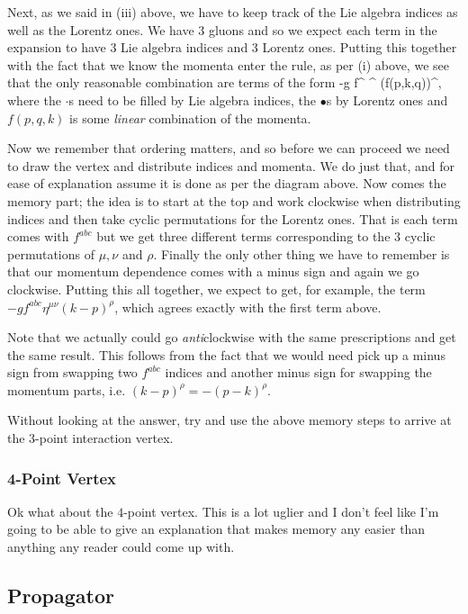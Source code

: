 Next, as we said in (iii) above, we have to keep track of the Lie algebra indices as well as the Lorentz ones. We have 3 gluons and so we expect each term in the expansion to have 3 Lie algebra indices and 3 Lorentz ones. Putting this together with the fact that we know the momenta enter the rule, as per (i) above, we see that the only reasonable combination are terms of the form 
\bse 
    -g f^{\cdot \cdot \cdot} \eta^{\bullet \bullet} (f(p,k,q))^{\bullet},
\ese 
where the $\cdot$s need to be filled by Lie algebra indices, the $\bullet$s by Lorentz ones and $f(p,q,k)$ is some \textit{linear} combination of the momenta.

Now we remember that ordering matters, and so before we can proceed we need to draw the vertex and distribute indices and momenta. We do just that, and for ease of explanation assume it is done as per the diagram above. Now comes the memory part; the idea is to start at the top and work clockwise when distributing indices and then take cyclic permutations for the Lorentz ones. That is each term comes with $f^{abc}$ but we get three different terms corresponding to the 3 cyclic permutations of $\mu,\nu$ and $\rho$. Finally the only other thing we have to remember is that our momentum dependence comes with a minus sign and again we go clockwise. Putting this all together, we expect to get, for example, the term $-gf^{abc}\eta^{\mu\nu}(k-p)^{\rho}$, which agrees exactly with the first term above.

\br 
    Note that we actually could go \textit{anti}clockwise with the same prescriptions and get the same result. This follows from the fact that we would need pick up a minus sign from swapping two $f^{abc}$ indices and another minus sign for swapping the momentum parts, i.e. $(k-p)^{\rho} = -(p-k)^{\rho}$. 
\er 

\bbox 
    Without looking at the answer, try and use the above memory steps to arrive at the 3-point interaction vertex. 
\ebox   

\subsubsection{4-Point Vertex}

Ok what about the $4$-point vertex. This is a lot uglier and I don't feel like I'm going to be able to give an explanation that makes memory any easier than anything any reader could come up with. 

\subsection{Propagator}

